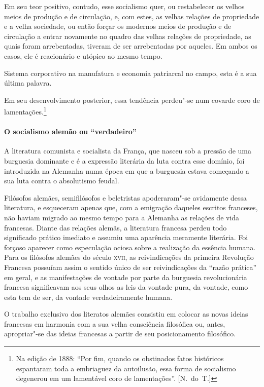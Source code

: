 Em seu teor positivo, contudo, esse socialismo quer, ou restabelecer os
velhos meios de produção e de circulação, e, com estes, as velhas
relações de propriedade e a velha sociedade, ou então forçar os
modernos meios de produção e de circulação a entrar novamente no quadro
das velhas relações de propriedade, as quais foram arrebentadas,
tiveram de ser arrebentadas por aqueles. Em ambos os casos, ele é
reacionário e utópico ao mesmo tempo.

Sistema corporativo na manufatura e economia patriarcal no campo, esta é
a sua última palavra.

Em seu desenvolvimento posterior, essa tendência perdeu"-se num
covarde coro de lamentações.\footnote{ Na edição de 1888: “Por fim, quando os obstinados fatos 		\EP[]
históricos espantaram toda a embriaguez da autoilusão, essa forma de
socialismo degenerou em um lamentável coro de lamentações”. [N.~do~T.]}

\paragraph{O socialismo alemão ou “verdadeiro”}

A literatura comunista e socialista da França, que nasceu sob a pressão
de uma burguesia dominante e é a expressão literária da luta contra
esse domínio, foi introduzida na Alemanha numa época em que a burguesia
estava começando a sua luta contra o absolutismo feudal.

Filósofos alemães, semifilósofos e beletristas apoderaram"-se
avidamente dessa literatura, e esqueceram apenas que, com a emigração
daqueles escritos franceses, não haviam migrado ao mesmo tempo para a
Alemanha as relações de vida francesas. Diante das relações alemãs, a
literatura francesa perdeu todo significado prático imediato e assumiu
uma aparência meramente literária. Foi forçoso aparecer como
especulação ociosa sobre a realização da essência humana. Para os
filósofos alemães do século \textsc{xvii}, as reivindicações da primeira
Revolução Francesa possuíam assim o sentido único de ser reivindicações
da “razão prática” em geral, e as manifestações de vontade por parte da
burguesia revolucionária francesa significavam aos seus olhos as leis
da vontade pura, da vontade, como esta tem de ser, da vontade
verdadeiramente humana.

O trabalho exclusivo dos literatos alemães consistiu em colocar as novas
ideias francesas em harmonia com a sua velha consciência filosófica ou,
antes, apropriar"-se das ideias francesas a partir de seu
posicionamento filosófico.

